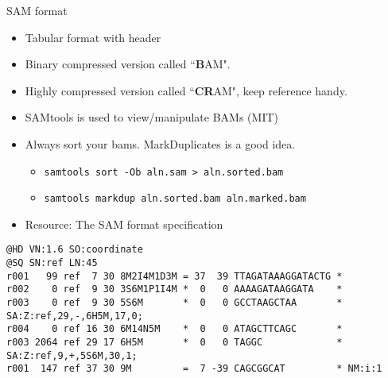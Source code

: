 \documentclass{beamer}
\begin{document}
\begin{frame}[fragile]{SAM format}
	\begin{itemize}
		\item Tabular format with header
		\item Binary compressed version called ``\textbf{B}AM".
		\item Highly compressed version called ``\textbf{CR}AM", keep reference handy.
		\item SAMtools is used to view/manipulate BAMs (MIT)
		\item Always sort your bams. MarkDuplicates is a good idea.
		\begin{itemize}
			\item \texttt{samtools sort -Ob aln.sam > aln.sorted.bam}
			\item \texttt{samtools markdup aln.sorted.bam aln.marked.bam}
		\end{itemize}
		\item Resource: The SAM format specification
	\end{itemize}
	\scriptsize{
	\begin{lstlisting}[frame = single]
@HD VN:1.6 SO:coordinate
@SQ SN:ref LN:45
r001   99 ref  7 30 8M2I4M1D3M = 37  39 TTAGATAAAGGATACTG *
r002    0 ref  9 30 3S6M1P1I4M *  0   0 AAAAGATAAGGATA    *
r003    0 ref  9 30 5S6M       *  0   0 GCCTAAGCTAA       * SA:Z:ref,29,-,6H5M,17,0;
r004    0 ref 16 30 6M14N5M    *  0   0 ATAGCTTCAGC       *
r003 2064 ref 29 17 6H5M       *  0   0 TAGGC             * SA:Z:ref,9,+,5S6M,30,1;
r001  147 ref 37 30 9M         =  7 -39 CAGCGGCAT         * NM:i:1
	\end{lstlisting}
	}

\end{frame}

\end{document}
